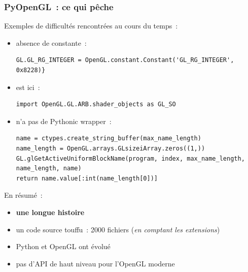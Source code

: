 \begin{frame}[fragile]
  \frametitle{PyOpenGL~: ce qui pêche}
  Exemples de difficultés rencontrées au cours du temps~:
    \begin{itemize}
    \item absence de constante~:%
      {\tiny\begin{verbatim}GL.GL_RG_INTEGER = OpenGL.constant.Constant('GL_RG_INTEGER', 0x8228)}\end{verbatim}}
    \item {} est ici~:%
      {\tiny\begin{verbatim}import OpenGL.GL.ARB.shader_objects as GL_SO\end{verbatim}}
    \item {} n'a pas de Pythonic wrapper~:
{\tiny%
\begin{verbatim}
name = ctypes.create_string_buffer(max_name_length)
name_length = OpenGL.arrays.GLsizeiArray.zeros((1,))
GL.glGetActiveUniformBlockName(program, index, max_name_length, name_length, name)
return name.value[:int(name_length[0])]
\end{verbatim}}
    \end{itemize}
    \vspace{1em}
    En résumé~:
    \begin{itemize}
    \item \textbf{une longue histoire}
    \item un code source touffu~: 2000 fichiers \small({\emph{en comptant les extensions})}
    \item Python et OpenGL ont évolué
    \item pas d'API de haut niveau pour l'OpenGL moderne %
    \end{itemize}
\end{frame}

